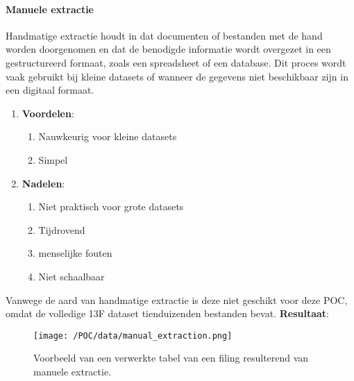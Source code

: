 \paragraph{Manuele extractie}
Handmatige extractie houdt in dat documenten of bestanden met de hand worden doorgenomen en dat de benodigde informatie wordt overgezet in een gestructureerd formaat, zoals een spreadsheet of een database. Dit proces wordt vaak gebruikt bij kleine datasets of wanneer de gegevens niet beschikbaar zijn in een digitaal formaat.

\begin{enumerate}
    \item \textbf{Voordelen}:
    \begin{enumerate}
        \item Nauwkeurig voor kleine datasets
        \item Simpel
    \end{enumerate}
    \item \textbf{Nadelen}:
    \begin{enumerate}
        \item Niet praktisch voor grote datasets
        \item Tijdrovend
        \item menselijke fouten
        \item Niet schaalbaar
    \end{enumerate}
\end{enumerate}
Vanwege de aard van handmatige extractie is deze niet geschikt voor deze POC, omdat de volledige 13F dataset tienduizenden bestanden bevat.
\textbf{Resultaat}: 
\begin{figure}[H]
    \centering        
    \texttt{[image: /POC/data/manual\_extraction.png]}
    \caption{Voorbeeld van een verwerkte tabel van een filing resulterend van manuele extractie.}
    \label{fig:table_proc}
\end{figure}

